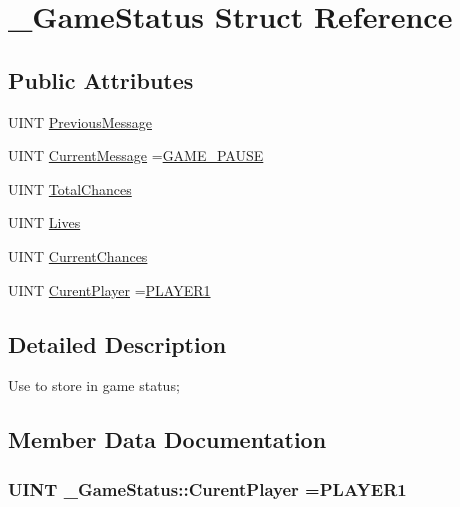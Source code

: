 \hypertarget{struct___game_status}{}\section{\+\_\+\+Game\+Status Struct Reference}
\label{struct___game_status}
\subsection*{Public Attributes}
\begin{DoxyCompactItemize}
\item 
U\+I\+N\+T \hyperlink{struct___game_status_a417bbdfd4ab8e689e76f3884bddbe3c2}{Previous\+Message}
\item 
U\+I\+N\+T \hyperlink{struct___game_status_a9ade8a83aa345c9b51695aab6ed240d2}{Current\+Message} =\hyperlink{_b_o_w-a_01film_01guessing_01game_8cpp_a703796878d6617a8b973f3446487fa85}{G\+A\+M\+E\+\_\+\+P\+A\+U\+S\+E}
\item 
U\+I\+N\+T \hyperlink{struct___game_status_a67b0d0d85dfe00b0f62ab90c24eec292}{Total\+Chances}
\item 
U\+I\+N\+T \hyperlink{struct___game_status_acbd5c161cfd6431a030841511febaeb7}{Lives}
\item 
U\+I\+N\+T \hyperlink{struct___game_status_a0b8840bf3ddfec74a158673707a1637e}{Current\+Chances}
\item 
U\+I\+N\+T \hyperlink{struct___game_status_a44203264d7b2cdbf97267c4f40387af5}{Curent\+Player} =\hyperlink{_b_o_w-a_01film_01guessing_01game_8cpp_aff32b2add5186520b5ae86864ebaf51a}{P\+L\+A\+Y\+E\+R1}
\end{DoxyCompactItemize}


\subsection{Detailed Description}
Use to store in game status; 

\subsection{Member Data Documentation}
\hypertarget{struct___game_status_a44203264d7b2cdbf97267c4f40387af5}{}
\subsubsection[{Curent\+Player}]{\setlength{\rightskip}{0pt plus 5cm}U\+I\+N\+T \+\_\+\+Game\+Status\+::\+Curent\+Player ={\bf P\+L\+A\+Y\+E\+R1}}\label{struct___game_status_a44203264d7b2cdbf97267c4f40387af5}
\hypertarget{struct___game_status_a0b8840bf3ddfec74a158673707a1637e}{}
